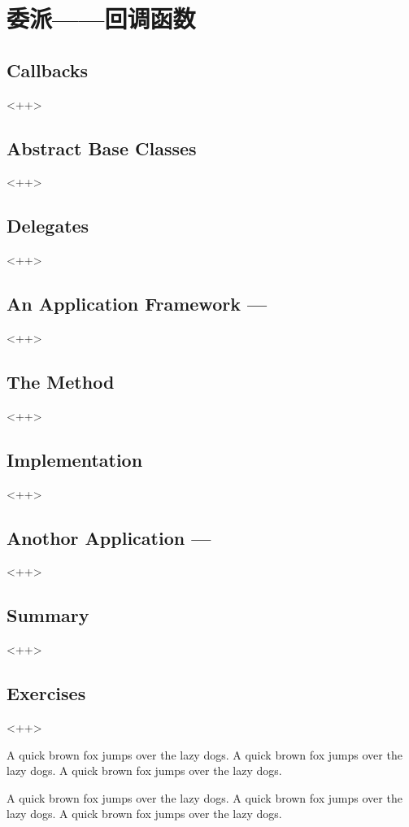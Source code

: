 

\chapter{委派——回调函数}
\label{ch:Delegates}

\section{Callbacks}<++>

\section{Abstract Base Classes}<++>

\section{Delegates}<++>

\section{An Application Framework ---}<++>

\section{The  Method}<++>

\section{Implementation}<++>

\section{Anothor Application ---}<++>

\section{Summary}<++>

\section{Exercises}<++>

A quick brown fox jumps over the lazy dogs.
A quick brown fox jumps over the lazy dogs.
A quick brown fox jumps over the lazy dogs.

A quick brown fox jumps over the lazy dogs.
A quick brown fox jumps over the lazy dogs.
A quick brown fox jumps over the lazy dogs.


